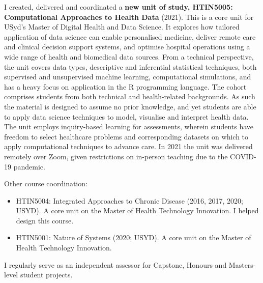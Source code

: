 \documentclass[a4paper]{article}
\begin{document}
I created, delivered and coordinated a \textbf{new unit of study, HTIN5005: Computational Approaches to Health Data} (2021).
This is a core unit for USyd's Master of Digital Health and Data Science.
It explores how tailored application of data science can enable personalised medicine, deliver remote care and clinical decision support systems, and optimise hospital operations using a wide range of health and biomedical data sources.
From a technical perspective, the unit covers data types, descriptive and inferential statistical techniques, both supervised and unsupervised machine learning, computational simulations, and has a heavy focus on application in the R programming language.
The cohort comprises students from both technical and health-related backgrounds.
As such the material is designed to assume no prior knowledge, and yet students are able to apply data science techniques to model, visualise and interpret health data.
The unit employs inquiry-based learning for assessments, wherein students have freedom to select healthcare problems and corresponding datasets on which to apply computational techniques to advance care.
In 2021 the unit was delivered remotely over Zoom, given restrictions on in-person teaching due to the COVID-19 pandemic.

Other course coordination:
\begin{itemize}
\item HTIN5004: Integrated Approaches to Chronic Disease (2016, 2017, 2020; USYD).  A core unit on the Master of Health Technology Innovation. I helped design this course.
\item HTIN5001: Nature of Systems (2020; USYD).  A core unit on the Master of Health Technology Innovation.
\end{itemize}

I regularly serve as an independent assessor for Capstone, Honours and Masters-level student projects.

\end{document}
